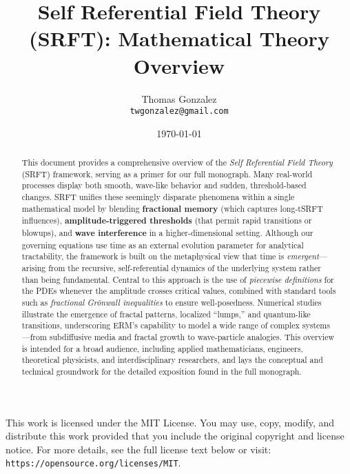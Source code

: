 \documentclass[12pt]{article}
\title{Self Referential Field Theory  (SRFT): Mathematical Theory Overview}
\author{%
  Thomas Gonzalez \\
  \small \texttt{twgonzalez@gmail.com}
}
\date{\today}
\begin{document}
\maketitle

\vfill
\noindent\hrulefill
\medskip

\noindent 
This work is licensed under the MIT License. You may use, copy, modify, and distribute this work provided that you include the original copyright and license notice.  For more details, see the full license text below or visit: \texttt{https://opensource.org/licenses/MIT}.
\medskip \\

\newpage

\maketitle

\begin{abstract}
This document provides a comprehensive overview of the \emph{Self Referential Field Theory } (SRFT) framework, serving as a primer for our full monograph. Many real-world processes display both smooth, wave-like behavior and sudden, threshold-based changes. SRFT unifies these seemingly disparate phenomena within a single mathematical model by blending \textbf{fractional memory} (which captures long-tSRFT influences), \textbf{amplitude-triggered thresholds} (that permit rapid transitions or blowups), and \textbf{wave interference} in a higher-dimensional setting. Although our governing equations use time as an external evolution parameter for analytical tractability, the framework is built on the metaphysical view that time is \emph{emergent}---arising from the recursive, self-referential dynamics of the underlying system rather than being fundamental. Central to this approach is the use of \emph{piecewise definitions} for the PDEs whenever the amplitude crosses critical values, combined with standard tools such as \emph{fractional Grönwall inequalities} to ensure well-posedness. Numerical studies illustrate the emergence of fractal patterns, localized “lumps,” and quantum-like transitions, underscoring ERM's capability to model a wide range of complex systems—from subdiffusive media and fractal growth to wave-particle analogies. This overview is intended for a broad audience, including applied mathematicians, engineers, theoretical physicists, and interdisciplinary researchers, and lays the conceptual and technical groundwork for the detailed exposition found in the full monograph.
\end{abstract}
\end{document}
